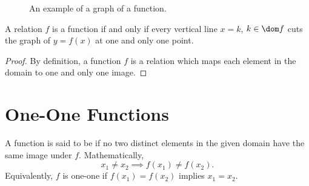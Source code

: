 \begin{example}
    \phantom{.}
    \begin{figure}[H]
        \centering
        \caption{An example of a graph of a function.}
    \end{figure}
\end{example}

\begin{proposition}
    A relation $f$ is a function if and only if every vertical line $x = k$, $k \in \dom f$ cuts the graph of $y = f(x)$ at one and only one point.
\end{proposition}
\begin{proof}
    By definition, a function $f$ is a relation which maps each element in the domain to one and only one image.
\end{proof}

\section{One-One Functions}

\begin{definition}
    A function is said to be  if no two distinct elements in the given domain have the same image under $f$. Mathematically, \[x_1 \neq x_2 \implies f(x_1) \neq f(x_2).\] Equivalently, $f$ is one-one if $f(x_1) = f(x_2)$ implies $x_1 = x_2$.
\end{definition}


